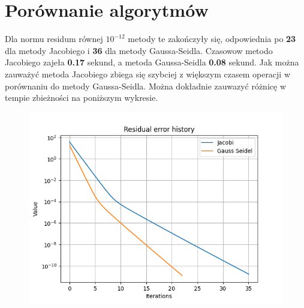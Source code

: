 \documentclass{article}
\begin{document}
\section{Porównanie algorytmów}
Dla normu residum równej \(10^{-12}\) metody te zakończyły się,
odpowiednia po \textbf{23} dla metody Jacobiego i \textbf{36} dla metody Gaussa-Seidla.
Czasowow metodo Jacobiego zajeła \textbf{0.17} sekund, a metoda Gaussa-Seidla \textbf{0.08} sekund.
Jak można zauważyć metoda Jacobiego zbiega się szybciej z większym czasem operacji w porównaniu do metody Gaussa-Seidla.
Można dokładnie zauwazyć różnicę w tempie zbieżności na poniższym wykresie.
\begin{figure}[H]
    \centering
    \includegraphics[width=1\linewidth]{figure0.png}
\end{figure}

\newpage
\end{document}
